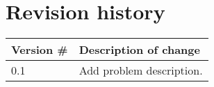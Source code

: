 \chapter*{Revision history}

\begin{center}
\begin{tabular}[H]{|l|p{35em}|}
\hline
Version \#  & Description of change\\%
\hline
      0.1   & Add problem description.\\
\hline
\end{tabular}
\end{center}